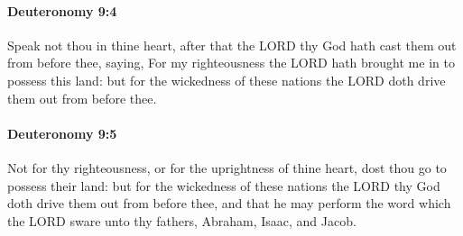 		\paragraph{Deuteronomy 9:4} %
			\label{DEUTERONOMY-9-4}

			Speak not thou in thine heart, after that the LORD thy God hath cast them out from before thee, saying, For my righteousness the LORD hath brought me in to possess this land: but for the wickedness of these nations the LORD doth drive them out from before thee.


		\paragraph{Deuteronomy 9:5} %
			\label{DEUTERONOMY-9-5}

			Not for thy righteousness, or for the uprightness of thine heart, dost thou go to possess their land: but for the wickedness of these nations the LORD thy God doth drive them out from before thee, and that he may perform the word which the LORD sware unto thy fathers, Abraham, Isaac, and Jacob.

